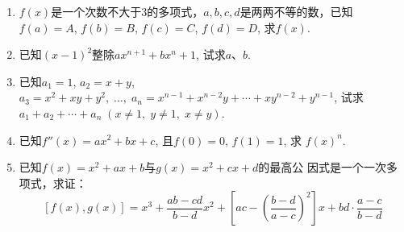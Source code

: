 \begin{enumerate}
\item $f(x)$是一个次数不大于3的多项式，$a,b,c,d$是两两不等的数，已知$f(a)=A$, $f(b)=B$, $f(c)=C$, $f(d)=D$, 求$f(x)$.
\item 已知$(x-1)^2$整除$ax^{n+1}+bx^n+1$, 试求$a$、$b$.
\item 已知$a_1=1$, $a_2=x+y$, $a_3=x^2+xy+y^2,\; \ldots,\; a_n=x^{n-1}+x^{n-2}y+\cdots +xy^{n-2}+y^{n-1}$, 试求$a_1+a_2+\cdots +a_n\; (x\ne 1,\; y\ne 1,\;x\ne y)$.
\item 已知$f''(x)=ax^2+bx+c$, 且$f(0)=0$, $f(1)=1$, 求
$f (x)^n$.
\item 已知$f(x)=x^2+ax+b$与$g(x)=x^2+cx+d$的最高公
因式是一个一次多项式，求证：
\[[f(x),g(x)]=x^3+\frac{ab-cd}{b-d}x^2+\left[ac-\left(\frac{b-d}{a-c}\right)^2\right]x+bd\cdot \frac{a-c}{b-d}\]
\end{enumerate}
